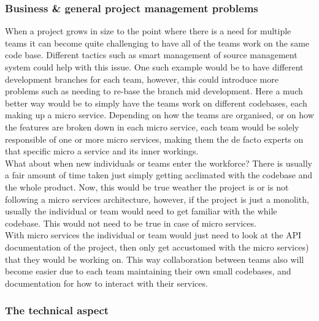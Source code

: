\documentclass{article}
\newcommand{\vspaceconst}{-2ex}
\begin{document}
\begin{multicols}{2}
\subsubsection{Business \& general project management problems}
\vspace{\vspaceconst}

When a project grows in size to the point where there is a need for multiple teams it can become quite challenging to have all of the teams work on the same code base. Different tactics such as smart management of source management system could help with this issue. One such example would be to have different development branches for each team, however, this could introduce more problems such as needing to re-base the branch mid development. Here a much better way would be to simply have the teams work on different codebases, each making up a micro service. Depending on how the teams are organised, or on how the features are broken down in each micro service, each team would be solely responsible of one or more micro services, making them the de facto experts on that specific micro a service and its inner workings.\\
What about when new individuals or teams enter the workforce? There is usually a fair amount of time taken just simply getting acclimated with the codebase and the whole product. Now, this would be true weather the project is or is not following a micro services architecture, however, if the project is just a monolith, usually the individual or team would need to get familiar with the while codebase. This would not need to be true in case of micro services.\\
With micro services the individual or team would just need to look at the API documentation of the project, then only get accustomed with the micro services) that they would be working on. This way collaboration between teams also will become easier due to each team maintaining their own small codebases, and documentation for how to interact with their services.\\

\subsubsection{The technical aspect}
\vspace{\vspaceconst}


\end{multicols}
\end{document}
